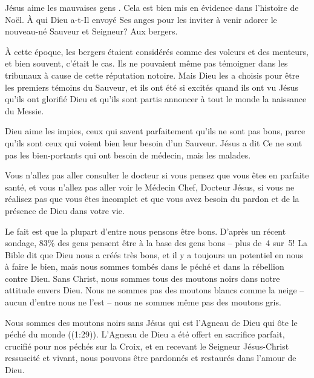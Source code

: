 

Jésus aime les \Og mauvaises gens \Fg{}. Cela est bien mis en évidence dans l'histoire de Noël. À qui Dieu a-t-Il envoyé Ses anges pour les inviter à venir adorer le nouveau-né Sauveur et Seigneur? Aux bergers.

À cette époque, les bergers étaient considérés comme des voleurs et des menteurs, et bien souvent, c'était le cas. Ils ne pouvaient même pas témoigner dans les tribunaux à cause de cette réputation notoire. Mais Dieu les a choisis pour être les premiers témoins du Sauveur, et ils ont été si excités quand ils ont vu Jésus qu'ils ont glorifié Dieu et qu'ils sont partis annoncer à tout le monde la naissance du Messie.

Dieu aime les impies, ceux qui savent parfaitement qu'ils ne sont pas bons, parce qu'ils sont ceux qui voient bien leur besoin d'un Sauveur. Jésus a dit\frcolon{} \Og Ce ne sont pas les bien-portants qui ont besoin de médecin, mais les malades. \Fg{}

Vous n'allez pas aller consulter le docteur si vous pensez que vous êtes en parfaite santé, et vous n'allez pas aller voir le Médecin Chef, Docteur Jésus, si vous ne réalisez pas que vous êtes incomplet et que vous avez besoin du pardon et de la présence de Dieu dans votre vie.

Le fait est que la plupart d'entre nous pensons être bons. D'après un récent sondage, 83\% des gens pensent être à la base des gens bons – plus de~4 sur~5! La Bible dit que Dieu nous a créés très bons, et il y a toujours un potentiel en nous à faire le bien, mais nous sommes tombés dans le péché et dans la rébellion contre Dieu. Sans Christ, nous sommes tous des moutons noirs dans notre attitude envers Dieu. Nous ne sommes pas des moutons blancs comme la neige – aucun d'entre nous ne l'est – nous ne sommes même pas des moutons gris.

Nous sommes des moutons noirs sans Jésus qui est \Og l'Agneau de Dieu qui ôte le péché du monde \Fg{} ((1:29)). L'Agneau de Dieu a été offert en sacrifice parfait, crucifié pour nos péchés sur la Croix, et en recevant le Seigneur Jésus-Christ ressuscité et vivant, nous pouvons être pardonnés et restaurés dans l'amour de Dieu.

